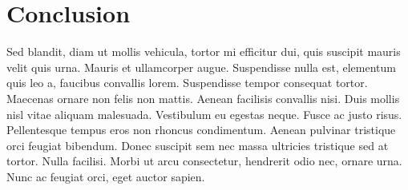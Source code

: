\section{Conclusion}
Sed blandit, diam ut mollis vehicula, tortor mi efficitur dui, quis suscipit mauris velit quis urna. Mauris et ullamcorper augue. Suspendisse nulla est, elementum quis leo a, faucibus convallis lorem. Suspendisse tempor consequat tortor. Maecenas ornare non felis non mattis. Aenean facilisis convallis nisi. Duis mollis nisl vitae aliquam malesuada. Vestibulum eu egestas neque. Fusce ac justo risus. Pellentesque tempus eros non rhoncus condimentum. Aenean pulvinar tristique orci feugiat bibendum. Donec suscipit sem nec massa ultricies tristique sed at tortor. Nulla facilisi. Morbi ut arcu consectetur, hendrerit odio nec, ornare urna. Nunc ac feugiat orci, eget auctor sapien.
      



